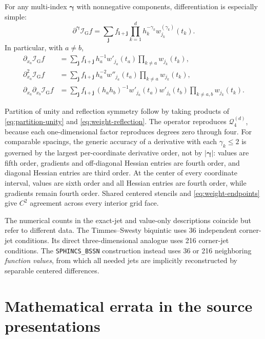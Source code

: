 \documentclass[11pt]{article}
\newcommand{\Q}{\mathcal{Q}}
\newcommand{\I}{\mathcal{I}}
\newcommand{\bj}{\boldsymbol{j}}
\newcommand{\bi}{\boldsymbol{i}}
\begin{document}
For any multi-index \(\boldsymbol{\gamma}\) with nonnegative components,
differentiation is especially simple:
\begin{equation}
  \partial^{\boldsymbol{\gamma}}\I_{\mathrm G}f
  =\sum_{\bj}f_{\bi+\bj}
    \prod_{k=1}^d
    h_k^{-\gamma_k}w_{j_k}^{(\gamma_k)}(t_k).
  \label{eq:grid-mixed-derivative}
\end{equation}
In particular, with $a\neq b$,
\begin{align}
  \partial_{x_a}\I_{\mathrm G}f
  &=\sum_{\bj}f_{\bi+\bj}\,
    h_a^{-1}w'_{j_a}(t_a)
    \prod_{k\neq a}w_{j_k}(t_k),
  \label{eq:grid-gradient}\\
  \partial_{x_a}^2\I_{\mathrm G}f
  &=\sum_{\bj}f_{\bi+\bj}\,
    h_a^{-2}w''_{j_a}(t_a)
    \prod_{k\neq a}w_{j_k}(t_k),
  \label{eq:grid-hessian-diagonal}\\
  \partial_{x_a}\partial_{x_b}\I_{\mathrm G}f
  &=\sum_{\bj}f_{\bi+\bj}\,
    (h_a h_b)^{-1}w'_{j_a}(t_a)w'_{j_b}(t_b)
    \prod_{k\neq a,b}w_{j_k}(t_k).
  \label{eq:grid-hessian-offdiagonal}
\end{align}

Partition of unity and reflection symmetry follow by taking products of
\eqref{eq:partition-unity} and \eqref{eq:weight-reflection}.  The operator
reproduces \(\Q_4^{(d)}\), because each one-dimensional factor reproduces
degrees zero through four.  For comparable spacings, the generic accuracy of
a derivative with each \(\gamma_k\leq2\) is governed by the largest
per-coordinate derivative order, not by \(|\boldsymbol{\gamma}|\): values are
fifth order, gradients and off-diagonal Hessian entries are fourth order, and
diagonal Hessian entries are third order.  At the center of every coordinate
interval, values are sixth order and all Hessian entries are fourth order,
while gradients remain fourth order.  Shared centered stencils and
\eqref{eq:weight-endpoints} give $C^2$ agreement across every interior grid
face.

The numerical counts in the exact-jet and value-only descriptions coincide
but refer to different data.  The Timmes--Swesty biquintic uses 36 independent
corner-jet conditions.  Its direct three-dimensional analogue uses 216
corner-jet conditions.  The \texttt{SPHINCS\_BSSN} construction instead uses
36 or 216 neighboring \emph{function values}, from which all needed jets are
implicitly reconstructed by separable centered differences.

\section{Mathematical errata in the source presentations}
\label{sec:errata}
\end{document}
